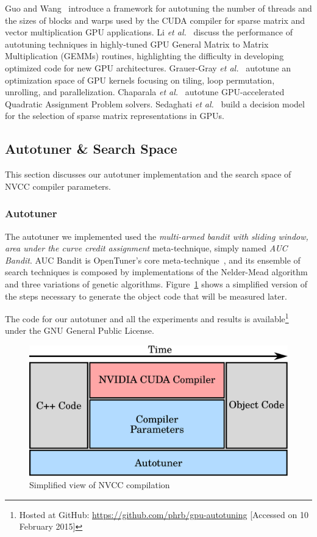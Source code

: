 Guo and Wang~\cite{guo2010auto} introduce a framework for autotuning
the number of threads and the sizes of blocks and warps used by the CUDA
compiler for sparse matrix and vector multiplication GPU applications.  Li
\emph{et al.}~\cite{li2009note} discuss the performance of autotuning
techniques in highly-tuned GPU General Matrix to Matrix Multiplication (GEMMs)
routines, highlighting the difficulty in developing optimized code for new GPU
architectures.  Grauer-Gray \emph{et al.}~\cite{grauer2012auto}
autotune an optimization space of GPU kernels focusing on tiling, loop
permutation, unrolling, and parallelization.  Chaparala \emph{et
al.}~\cite{chaparala2015autotuning} autotune GPU-accelerated Quadratic
Assignment Problem solvers.  Sedaghati \emph{et
al.}~\cite{sedaghati2015automatic} build a decision model for the selection of
sparse matrix representations in GPUs.

\subsection{Autotuner \& Search Space}
\label{sec:tunersearch}

This section discusses our autotuner implementation and the
search space of NVCC compiler parameters.

\subsubsection{Autotuner}

The autotuner we implemented used the \textit{multi-armed bandit with sliding
window, area under the curve credit assignment} meta-technique, simply named
\textit{AUC Bandit}.  AUC Bandit is OpenTuner's core
meta-technique~\cite{ansel2014opentuner}, and its ensemble of search techniques
is composed by implementations of the Nelder-Mead algorithm and three
variations of genetic algorithms.  Figure~\ref{fig:gpu-stack} shows a
simplified version of the steps necessary to generate the object code that will
be measured later.

The code for our autotuner and all the experiments and results is
available\footnote{Hosted at GitHub:
\url{https://github.com/phrb/gpu-autotuning} [Accessed on 10 February 2015]}
under the GNU General Public License.

\begin{figure}[htpb]
    \centering
    \includegraphics[width=.4\textwidth]{./images/gpu-stack}
    \caption{Simplified view of NVCC compilation}
    \label{fig:gpu-stack}
\end{figure}

